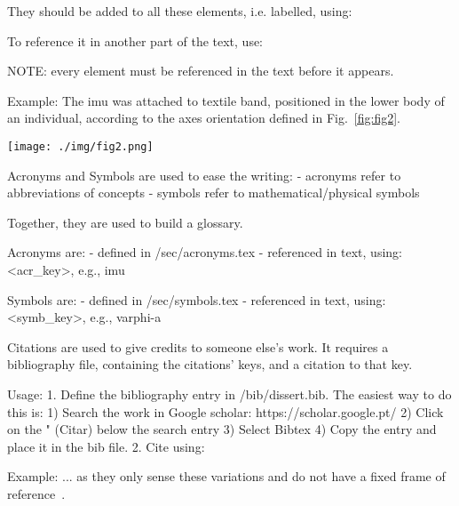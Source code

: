 They should be added to all these elements, i.e. labelled, using:

To reference it in another part of the text, use:

NOTE: every element must be referenced in the text before it appears.

Example:
The \gls{imu} was attached to textile band, positioned in the lower body of an
individual, according to the axes orientation defined in Fig.~\ref{fig:fig2}.
\begin{figure*} 
\centering
    \texttt{[image: ./img/fig2.png]}
  \caption{System used for inertial
    data acquisition: orientation of the \gls{imu} during the data acquisition
    and orientation after the compensation; acquisition protocol (withdrawn from~\cite{cav-enunc})}%
\label{fig:fig2}
\end{figure*}

Acronyms and Symbols are used to ease the writing:
- acronyms refer to abbreviations of concepts
- symbols refer to mathematical/physical symbols

Together, they are used to build a glossary.

Acronyms are:
- defined in /sec/acronyms.tex
- referenced in text, using: \gls{<acr_key>}, e.g., \gls{imu}

Symbols are:
- defined in /sec/symbols.tex
- referenced in text, using: \gls{<symb_key>}, e.g., \gls{varphi-a}

Citations are used to give credits to someone else's work. 
It requires a bibliography file, containing the citations' keys, and a 
citation to that key.

Usage:
1. Define the bibliography entry in /bib/dissert.bib. The easiest way to do this is:
  1) Search the work in Google scholar: https://scholar.google.pt/
  2) Click on the " (Citar) below the search entry
  3) Select Bibtex
  4) Copy the entry and place it in the bib file.
2. Cite using: %

Example:
... as they only sense these variations and do not have a fixed frame of
reference~\cite{mccarron2013low}.

